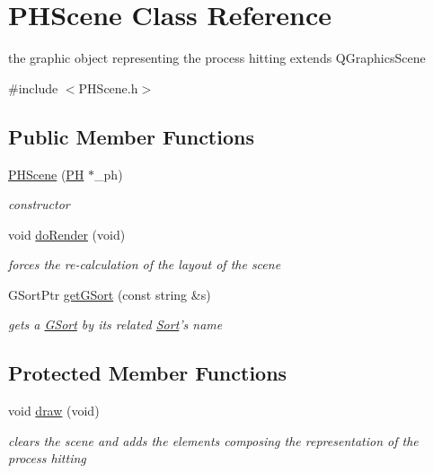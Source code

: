 \hypertarget{class_p_h_scene}{\section{\-P\-H\-Scene \-Class \-Reference}
\label{class_p_h_scene}
}


the graphic object representing the process hitting extends \-Q\-Graphics\-Scene  




{\ttfamily \#include $<$\-P\-H\-Scene.\-h$>$}

\subsection*{\-Public \-Member \-Functions}
\begin{DoxyCompactItemize}
\item 
\hypertarget{class_p_h_scene_ab911261388ccc14254980b5d01909d61}{\hyperlink{class_p_h_scene_ab911261388ccc14254980b5d01909d61}{\-P\-H\-Scene} (\hyperlink{class_p_h}{\-P\-H} $\ast$\-\_\-ph)}\label{class_p_h_scene_ab911261388ccc14254980b5d01909d61}

\begin{DoxyCompactList}\small\item\em constructor \end{DoxyCompactList}\item 
\hypertarget{class_p_h_scene_a2f9dbd3f096e6cfcd9e924617bcc7d98}{void \hyperlink{class_p_h_scene_a2f9dbd3f096e6cfcd9e924617bcc7d98}{do\-Render} (void)}\label{class_p_h_scene_a2f9dbd3f096e6cfcd9e924617bcc7d98}

\begin{DoxyCompactList}\small\item\em forces the re-\/calculation of the layout of the scene \end{DoxyCompactList}\item 
\-G\-Sort\-Ptr \hyperlink{class_p_h_scene_ae8be020b063c06f135d644937d65147b}{get\-G\-Sort} (const string \&s)
\begin{DoxyCompactList}\small\item\em gets a \hyperlink{class_g_sort}{\-G\-Sort} by its related \hyperlink{class_sort}{\-Sort}'s name \end{DoxyCompactList}\end{DoxyCompactItemize}
\subsection*{\-Protected \-Member \-Functions}
\begin{DoxyCompactItemize}
\item 
\hypertarget{class_p_h_scene_ad4a998d52e4b2422101a63ba05a24092}{void \hyperlink{class_p_h_scene_ad4a998d52e4b2422101a63ba05a24092}{draw} (void)}\label{class_p_h_scene_ad4a998d52e4b2422101a63ba05a24092}

\begin{DoxyCompactList}\small\item\em clears the scene and adds the elements composing the representation of the process hitting \end{DoxyCompactList}\end{DoxyCompactItemize}
